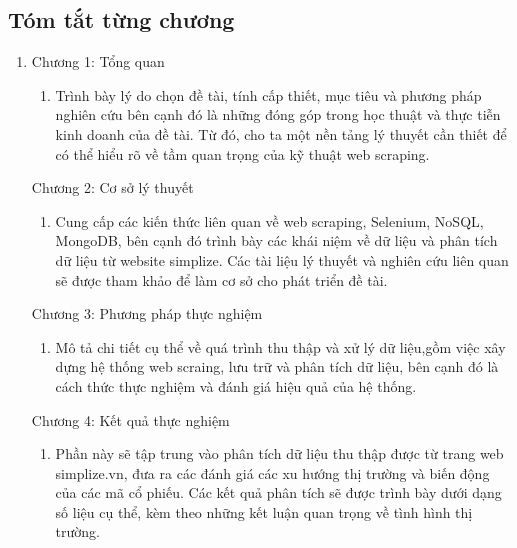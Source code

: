 \subsection{Tóm tắt từng chương}
\begin{enumerate}
    \item []
    \hspace*{0.7cm}Chương 1: Tổng quan
    \begin{enumerate}
        \item []
        \hspace*{1.5cm}Trình bày lý do chọn đề tài, tính cấp thiết, mục tiêu và phương pháp nghiên cứu bên cạnh đó là những đóng góp trong học thuật và thực tiễn kinh doanh của đề tài. Từ đó, cho ta một nền tảng lý thuyết cần thiết để có thể hiểu rõ về tầm quan trọng của kỹ thuật web scraping.
    \end{enumerate}
    
    \hspace*{0.7cm}Chương 2: Cơ sở lý thuyết
    \begin{enumerate}
        \item []
        \hspace*{1.5cm}Cung cấp các kiến thức liên quan về web scraping, Selenium, NoSQL, MongoDB, bên cạnh đó trình bày các khái niệm về dữ liệu và phân tích dữ liệu từ website simplize. Các tài liệu lý thuyết và nghiên cứu liên quan sẽ được tham khảo để làm cơ sở cho phát triển đề tài.
    \end{enumerate}
    
    \hspace*{0.7cm}Chương 3: Phương pháp thực nghiệm 
    \begin{enumerate}
        \item []
        \hspace*{1.5cm}Mô tả chi tiết cụ thể về quá trình thu thập và xử lý dữ liệu,gồm việc xây dựng hệ thống web scraing, lưu trữ và phân tích dữ liệu, bên cạnh đó là cách thức thực nghiệm và đánh giá hiệu quả của hệ thống.
    \end{enumerate}
    
    \newpage
    
    \hspace*{0.7cm}Chương 4: Kết quả thực nghiệm
    \begin{enumerate}
        \item []
        \hspace*{1.5cm}Phần này sẽ tập trung vào phân tích dữ liệu thu thập được từ trang web simplize.vn, đưa ra các đánh giá các xu hướng thị trường và biến động của các mã cổ phiếu. Các kết quả phân tích sẽ được trình bày dưới dạng số liệu cụ thể, kèm theo những kết luận quan trọng về tình hình thị trường. 
    \end{enumerate}
        
\end{enumerate}